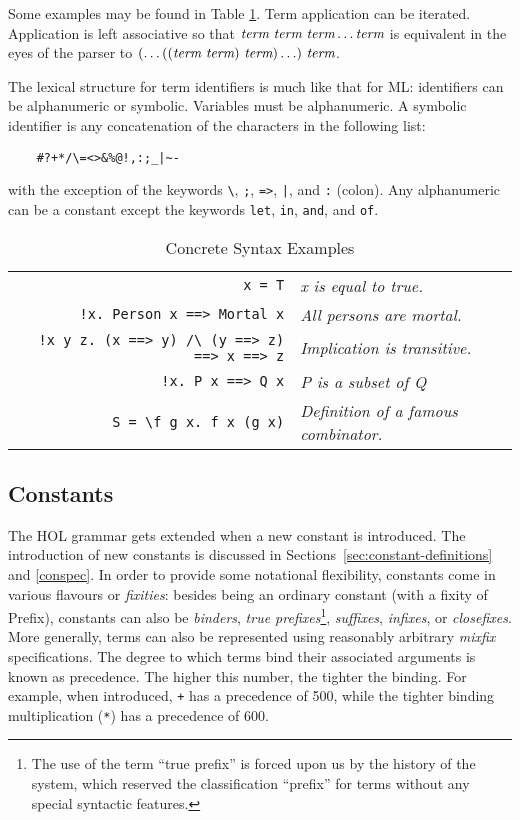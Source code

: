 {Some examples may be found in Table \ref{syntaxExamples}. Term
application can be iterated. Application is left associative so that
$\mbox{\it term}\ \mbox{\it term}\ \mbox{\it term} \ldots \mbox{\it term}$ is equivalent in the eyes of the
parser to $(\ldots((\term\ \term)\ \term) \ldots)\ \term$.

The lexical structure for term identifiers is much like that for
ML: identifiers can be alphanumeric or symbolic. Variables must be
alphanumeric. A symbolic identifier is any concatenation of the characters
in the following list:
\begin{verbatim}
    #?+*/\=<>&%@!,:;_|~-
\end{verbatim}
with the exception of the keywords \verb+\+, \verb+;+, \verb+=>+,
\verb+|+, and \verb+:+ (colon). Any alphanumeric can be a constant except the
keywords \verb+let+, \verb+in+, \verb+and+, and \verb+of+.

 \begin{table}[h]
\begin{center}
 \begin{tabular}{|r|l|} \hline
 \verb+x = T+ & {\it x is equal to true.} \\
 \verb+!x. Person x ==> Mortal x+ & {\it All persons are mortal.} \\
 \verb+!x y z. (x ==> y) /\ (y ==> z) ==> x ==> z+ & {\it Implication is
 transitive.} \\
 \verb+!x. P x ==> Q x+ & {\it P is a subset of Q} \\
 \verb+S = \f g x. f x (g x)+ & {\it Definition of a famous combinator.} \\ \hline
 \end{tabular}
 \caption{Concrete Syntax Examples}\label{syntaxExamples}
\end{center}
 \end{table}


\subsection{Constants}

The HOL grammar gets extended when a new constant is introduced. The
introduction of new constants is discussed in
Sections~\ref{sec:constant-definitions} and \ref{conspec}. In order to provide some notational flexibility,
constants come in various flavours or {\it fixities}: besides being an
ordinary constant (with a fixity of {\sf Prefix}), constants can also
be {\it binders}, {\it true prefixes}\footnote{The use of the term
  ``true prefix'' is forced upon us by the history of the system,
  which reserved the classification ``prefix'' for terms without any
  special syntactic features.}, {\it suffixes}, {\it infixes}, or {\it
  closefixes}.  More generally, terms can also be represented using
reasonably arbitrary {\it mixfix} specifications.  The degree to which
terms bind their associated arguments is known as precedence.  The
higher this number, the tighter the binding.  For example, when
introduced, \verb-+- has a precedence of 500, while the tighter
binding multiplication (\verb+*+) has a precedence of 600.

}

